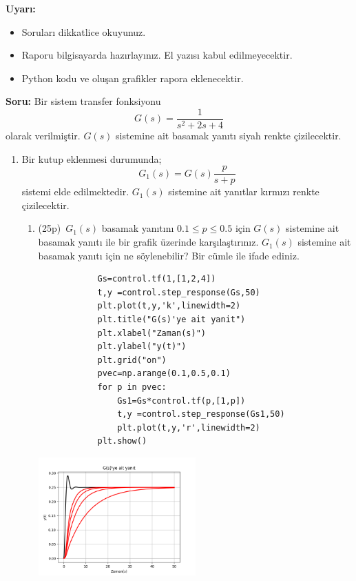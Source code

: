 \noindent\textbf{Uyarı:}
\begin{itemize}\bfseries
    \item Soruları dikkatlice okuyunuz. 
    \item Raporu bilgisayarda hazırlayınız. El yazısı kabul edilmeyecektir.
    \item Python kodu ve oluşan grafikler rapora eklenecektir.
\end{itemize}
\noindent\textbf{Soru:} Bir sistem transfer fonksiyonu 
\begin{equation}
    G(s)=\frac{1}{s^2+2s+4}
\end{equation}
olarak verilmiştir. $G(s)$ sistemine ait basamak yanıtı siyah renkte çizilecektir.

\begin{enumerate}[\bfseries 1.]
    \item Bir kutup eklenmesi durumunda; 
    \begin{equation}
        G_1(s)=G(s)\frac{p}{s+p}
    \end{equation}
    sistemi elde edilmektedir. $G_1(s)$ sistemine ait yanıtlar kırmızı renkte çizilecektir. \begin{enumerate}
        \item (25p)\, $G_1(s)$ basamak yanıtını $0.1\leq p\leq 0.5$ için $G(s)$ sistemine ait basamak yanıtı ile bir grafik üzerinde karşılaştırınız. $G_1(s)$ sistemine ait basamak yanıtı için ne söylenebilir? Bir cümle ile ifade ediniz.

        \begin{lstlisting}
            Gs=control.tf(1,[1,2,4])
            t,y =control.step_response(Gs,50)
            plt.plot(t,y,'k',linewidth=2)
            plt.title("G(s)'ye ait yanit")
            plt.xlabel("Zaman(s)")
            plt.ylabel("y(t)")
            plt.grid("on")
            pvec=np.arange(0.1,0.5,0.1)
            for p in pvec:
                Gs1=Gs*control.tf(p,[1,p])
                t,y =control.step_response(Gs1,50)
                plt.plot(t,y,'r',linewidth=2)
            plt.show()
        \end{lstlisting}

        \centering\includegraphics[width=0.5\textwidth]{plot1}


\end{enumerate}
\end{enumerate}
